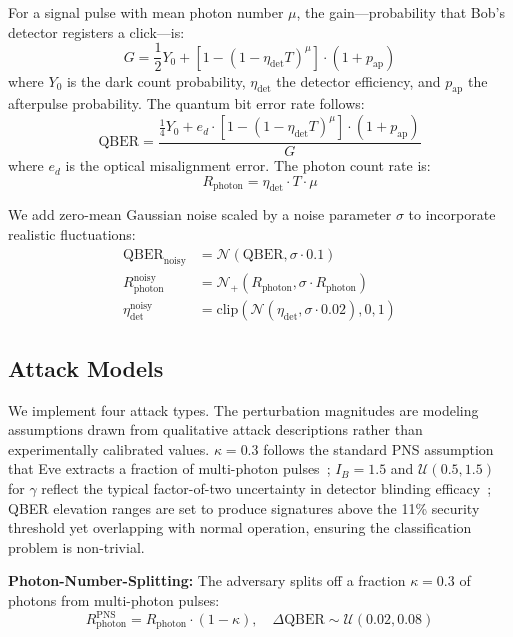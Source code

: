 \documentclass[conference,10pt]{IEEEtran}
\begin{document}
For a signal pulse with mean photon number $\mu$, the gain---probability that Bob's detector registers a click---is:
\begin{equation}
G = \frac{1}{2} Y_0 + \left[1 - (1 - \eta_{\text{det}} T)^\mu\right] \cdot (1 + p_{\text{ap}})
\end{equation}
where $Y_0$ is the dark count probability, $\eta_{\text{det}}$ the detector efficiency, and $p_{\text{ap}}$ the afterpulse probability. The quantum bit error rate follows:
\begin{equation}
\text{QBER} = \frac{\frac{1}{4}Y_0 + e_d \cdot \left[1 - (1 - \eta_{\text{det}} T)^\mu\right] \cdot (1 + p_{\text{ap}})}{G}
\end{equation}
where $e_d$ is the optical misalignment error. The photon count rate is:
\begin{equation}
R_{\text{photon}} = \eta_{\text{det}} \cdot T \cdot \mu
\end{equation}

We add zero-mean Gaussian noise scaled by a noise parameter $\sigma$ to incorporate realistic fluctuations:
\begin{align}
\text{QBER}_{\text{noisy}} &= \mathcal{N}\!\left(\text{QBER}, \sigma\cdot 0.1\right) \\
R_{\text{photon}}^{\text{noisy}} &= \mathcal{N}_+\!\left(R_{\text{photon}}, \sigma\cdot R_{\text{photon}}\right) \\
\eta_{\text{det}}^{\text{noisy}} &= \text{clip}\!\left(\mathcal{N}(\eta_{\text{det}}, \sigma\cdot 0.02), 0, 1\right)
\end{align}

\subsection{Attack Models}

We implement four attack types. The perturbation magnitudes are modeling assumptions drawn from qualitative attack descriptions rather than experimentally calibrated values. $\kappa = 0.3$ follows the standard PNS assumption that Eve extracts a fraction of multi-photon pulses~\cite{huttner1995photon}; $I_B = 1.5$ and $\mathcal{U}(0.5, 1.5)$ for $\gamma$ reflect the typical factor-of-two uncertainty in detector blinding efficacy~\cite{makarov2006detector}; QBER elevation ranges are set to produce signatures above the 11\% security threshold yet overlapping with normal operation, ensuring the classification problem is non-trivial.

\textbf{Photon-Number-Splitting:} The adversary splits off a fraction $\kappa = 0.3$ of photons from multi-photon pulses:
\begin{equation}
R_{\text{photon}}^{\text{PNS}} = R_{\text{photon}} \cdot (1 - \kappa), \quad \Delta\text{QBER} \sim \mathcal{U}(0.02, 0.08)
\end{equation}
\end{document}
